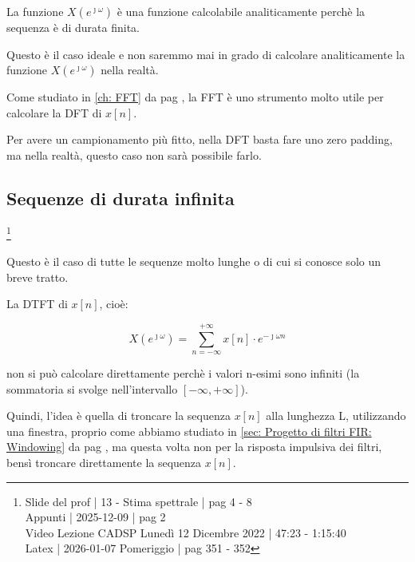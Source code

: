 La funzione $X \left(e^{\jmath \omega}\right)$ è una funzione calcolabile analiticamente perchè la sequenza è di durata finita. \newline 

Questo è il caso ideale e non saremmo mai in grado di calcolare analiticamente la funzione $X \left(e^{\jmath \omega}\right)$ nella realtà. \newline 

Come studiato in \ref{ch: FFT}  da pag \pageref{ch: FFT}, la FFT è uno strumento molto utile per calcolare la DFT di $x \left[ n\right]$. \newline 

Per avere un campionamento più fitto, nella DFT basta fare uno zero padding, ma nella realtà, questo caso non sarà possibile farlo. \newline 

\newpage 

\subsection{Sequenze di durata infinita}

\footnote{ 
    Slide del prof | 13 - Stima spettrale | pag 4 - 8\\
    Appunti | 2025-12-09 | pag 2  \\ 
    Video Lezione CADSP Lunedì 12 Dicembre 2022 | 47:23 - 1:15:40 \\ 
    Latex | 2026-01-07 Pomeriggio | pag 351 - 352     
}

Questo è il caso di tutte le sequenze molto lunghe o di cui si conosce solo un breve tratto. \newline 

La DTFT di $x \left[ n\right]$, cioè: 

{
    \Large 
    \begin{equation}
        X \left(e^{\jmath \omega}\right)
        = 
        \sum_{n = - \infty}^{+ \infty} 
        x \left[ n\right]
        \cdot 
        e^{-\jmath \omega n}
    \end{equation}
}

non si può calcolare direttamente perchè i valori n-esimi sono infiniti (la sommatoria si svolge nell'intervallo $\left[ - \infty, + \infty\right]$). \newline 

Quindi, l'idea è quella di troncare la sequenza $x \left[ n\right]$ alla lunghezza L, utilizzando una finestra, proprio come abbiamo studiato in \ref{sec: Progetto di filtri FIR: Windowing}  da pag \pageref{sec: Progetto di filtri FIR: Windowing}, 
ma questa volta non per la risposta impulsiva dei filtri, bensì troncare direttamente la sequenza $x \left[ n\right]$. \newline 

